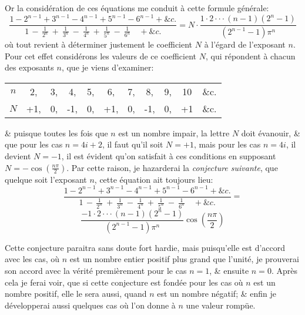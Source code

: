 \documentclass[12pt]{article}
\theoremstyle{definition}
\begin{document}
Or la considération de ces équations me conduit à cette formule générale:
$$\frac{1 - 2^{n-1} + 3^{n-1} - 4^{n-1} + 5^{n-1} - 6^{n-1} + \&c.}{\displaystyle 1 \, - \, \frac{1}{2^n} \ + \: \frac{1}{3^n} \ - \: \frac{1}{4^n} \ + \: \frac{1}{5^n} \ - \:  \frac{1}{6^n} \quad + \&c.} = N\cdot \frac{1\cdot 2 \cdot \cdot \cdot (n-1)(2^n - 1)}{(2^{n-1} - 1)\pi^n}$$
où tout revient à déterminer justement le coefficient $N$ à l'égard de l'exposant $n$. Pour cet effet considérons les valeurs de ce coefficient $N$, qui répondent à chacun des exposants $n$, que je viens d'examiner:
\begin{center}
\begin{tabular}{ c | c c c c c c c c c c }
  $n$ & 2, & 3, & 4, & 5, & 6, & 7, & 8, & 9, & 10 & \&c. \\
  $N$ & +1, & 0, & -1, & 0, & +1, & 0, & -1, & 0, & +1 & \&c. \\
\end{tabular}
\end{center}
\& puisque toutes les fois que $n$ est un nombre impair, la lettre $N$ doit évanouir, \& que pour les cas $n = 4i + 2$, il faut qu'il soit $N = +1$, mais pour les cas $n = 4i$, il devient $N = -1$, il est évident qu'on satisfait à ces conditions en supposant $N = -\cos(\frac{n\pi}{2})$. Par cette raison, je hazarderai la \textit{conjecture suivante}, que quelque soit l'exposant $n$, cette équation ait toujours lieu:
$$\frac{1 - 2^{n-1} + 3^{n-1} - 4^{n-1} + 5^{n-1} - 6^{n-1} + \&c.}{\displaystyle 1 \, - \, \frac{1}{2^n} \ + \: \frac{1}{3^n} \ - \: \frac{1}{4^n} \ + \: \frac{1}{5^n} \ - \:  \frac{1}{6^n} \quad + \&c.} =$$
$$\frac{-1\cdot 2 \cdot \cdot \cdot (n-1)(2^n - 1)}{(2^{n-1} - 1)\pi^n}\cos \left(\frac{n \pi }{2}\right)$$

Cette conjecture paraitra sans doute fort hardie, mais puisqu'elle est d'accord avec les cas, où $n$ est un nombre entier positif plus grand que l'unité, je prouverai son accord avec la vérité premièrement pour le cas $n = 1$, \& ensuite $n = 0$. Après cela je ferai voir, que si cette conjecture est fondée pour les cas où $n$ est un nombre positif, elle le sera aussi, quand $n$ est un nombre négatif; \& enfin je développerai aussi quelques cas où l'on donne à $n$ une valeur rompüe.
\end{document}
